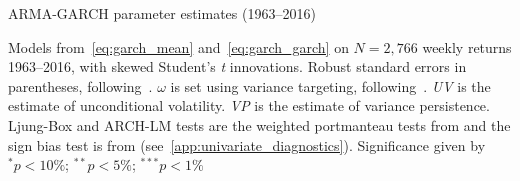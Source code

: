 
\begin{table}
  \centering
  \footnotesize
  \renewcommand{\arraystretch}{1.2}

  \caption{ARMA-GARCH parameter estimates (1963--2016)}

  \begin{longcaption}
    Models from~\autoref{eq:garch_mean} and~\autoref{eq:garch_garch} on $N = 2,766$ weekly returns 1963--2016, with skewed Student's \emph{t} innovations. Robust standard errors in parentheses, following~\textcite{White1982}. $\omega$ is set using variance targeting, following~\textcite{EngleMezrich1995}. \emph{UV} is the estimate of unconditional volatility. \emph{VP} is the estimate of variance persistence. Ljung-Box and ARCH-LM tests are the weighted portmanteau tests from \textcite{FisherGallagher2012} and the sign bias test is from \textcite{EngleNg1993} (see~\autoref{app:univariate_diagnostics}). Significance given by $^{*}p<10\%$; $^{**}p<5\%$; $^{***}p<1\%$
  \end{longcaption}
 

\end{table}
